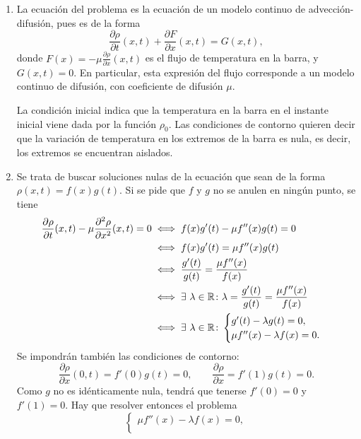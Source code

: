 \documentclass[11pt]{report}
\begin{document}
\begin{solution}
    \hfill
    \begin{enumerate}
        \item La ecuación del problema es la ecuación de un modelo continuo de advección-difusión, pues es de la forma
        \[\frac{\partial \rho}{\partial t}(x,t)+\frac{\partial F}{\partial x}(x,t) = G(x,t),\]
        donde $F(x) = -\mu\frac{\partial \rho}{\partial x}(x,t)$ es el flujo de temperatura en la barra, y $G(x,t) = 0$. En particular, esta expresión del flujo corresponde a un modelo continuo de difusión, con coeficiente de difusión $\mu$.
        
        La condición inicial indica que la temperatura en la barra en el instante inicial viene dada por la función $\rho_0$. Las condiciones de contorno quieren decir que la variación de temperatura en los extremos de la barra es nula, es decir, los extremos se encuentran aislados.
        \item Se trata de buscar soluciones nulas de la ecuación que sean de la forma $\rho(x,t) = f(x)g(t)$. Si se pide que $f$ y $g$ no se anulen en ningún punto, se tiene
        \begin{align*}
            \frac{\partial\rho}{\partial t}(x,t)- \mu\frac{\partial^2\rho}{\partial x^2}(x,t) = 0 &\iff f(x)g'(t)-\mu f''(x)g(t) = 0 \\
            &\iff f(x)g'(t) = \mu f''(x)g(t) \\
            &\iff \frac{g'(t)}{g(t)} = \frac{\mu f''(x)}{f(x)} \\
            &\iff \exists \ \lambda\in\mathbb R \colon \lambda = \frac{g'(t)}{g(t)} = \frac{\mu f''(x)}{f(x)} \\
            &\iff \exists \ \lambda\in\mathbb R \colon \begin{cases}
                g'(t)-\lambda g(t) = 0, \\
                \mu f''(x) - \lambda f(x) = 0.
            \end{cases} \\
        \end{align*}
        Se impondrán también las condiciones de contorno:
        \[\frac{\partial \rho}{\partial x}(0,t) = f'(0)g(t) = 0, \qquad \frac{\partial \rho}{\partial x} = f'(1)g(t) = 0.\]
        Como $g$ no es idénticamente nula, tendrá que tenerse $f'(0) = 0$ y $f'(1) = 0$. Hay que resolver entonces el problema
        \[\begin{cases}
            \mu f''(x) - \lambda f(x) = 0, \\

\end{cases}\]
\end{enumerate}
\end{solution}
\end{document}
